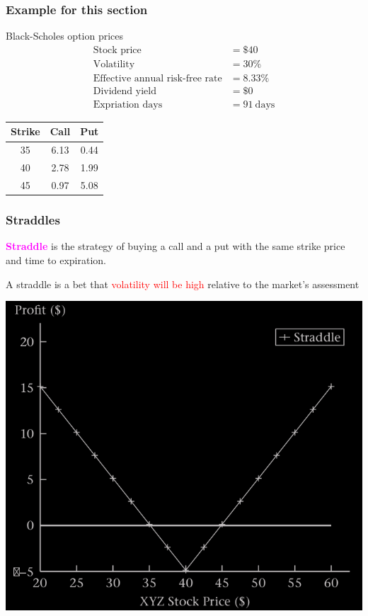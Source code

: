 \begin{frame}[fragile,t]
	\frametitle{Example for this section}
	\begin{center}
		Black-Scholes option prices \\
		\begin{align*}
			\text{Stock price}                     & = \$40   \\
			\text{Volatility}                      & = 30\%   \\
			\text{Effective annual risk-free rate} & = 8.33\% \\
			\text{Dividend yield} & = \$0 \\
			\text{Expriation days} & = 91~\text{days}
		\end{align*}

		\bigskip
		\renewcommand{\arraystretch}{1.2}
		\begin{tabular}{ccc}
			\hline
			Strike & Call & Put  \\
			\hline
			35     & 6.13 & 0.44 \\
			40     & 2.78 & 1.99 \\
			45     & 0.97 & 5.08 \\
		\end{tabular}
		\end{center}
\end{frame}
\begin{frame}[fragile,t]
	\frametitle{Straddles}

	\textcolor{magenta}{\bf Straddle} is the strategy of buying a call and a put with the same strike
	price and time to expiration.
	\bigskip

	A straddle is a bet that \textcolor{red}{volatility will be high} relative to the market’s assessment
	\bigskip

	\begin{center}
		\includegraphics[scale=0.25]{figs/Figure-3-10.png}
	\end{center}
\end{frame}
